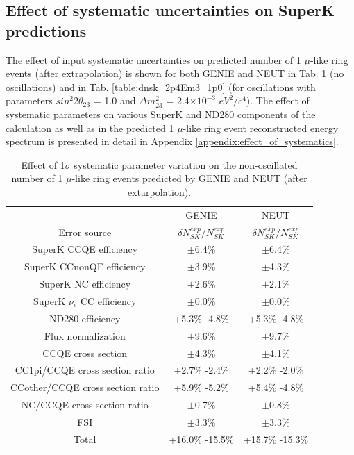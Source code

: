 \clearpage

\subsection {Effect of systematic uncertainties on SuperK predictions}
\label{sec:systematics_tweaked_spectra}

The effect of input systematic uncertainties on predicted number of 1 $\mu$-like ring 
events (after extrapolation) is shown for both GENIE and NEUT 
in Tab. \ref{table:dnsk_noosc} (no oscillations) and
in Tab. \ref{table:dnsk_2p4Em3_1p0} (for oscillations with parameters
$sin^{2}2\theta_{23}$ = 1.0 and $\Delta m^{2}_{23}$ = 2.4$\times10^{-3}$ $eV^{2}/c^{4}$).
The effect of systematic parameters on various SuperK and ND280 components of
the calculation as well as in the predicted 1 $\mu$-like ring event reconstructed energy
spectrum is presented in detail in Appendix \ref{appendix:effect_of_systematics}.

\begin{table}[htb]
\center
\renewcommand{\arraystretch}{1.75} %
\begin{tabular}{|c|c|c|}
\hline
       & GENIE & NEUT \\
Error source  &
  $\delta{N^{exp}_{SK}}/N^{exp}_{SK}$  &
  $\delta{N^{exp}_{SK}}/N^{exp}_{SK}$  \\
\hline
SuperK CCQE efficiency            &   $\pm$6.4\%      &   $\pm$6.4\%      \\
SuperK CCnonQE efficiency         &   $\pm$3.9\%      &   $\pm$4.3\%      \\
SuperK NC efficiency              &   $\pm$2.6\%      &   $\pm$2.1\%      \\
SuperK $\nu_{e}$ CC efficiency    &   $\pm$0.0\%      &   $\pm$0.0\%      \\
ND280 efficiency                  &   +5.3\% -4.8\%   &   +5.3\% -4.8\%   \\
Flux normalization                &   $\pm$9.6\%      &   $\pm$9.7\%      \\
CCQE cross section                &   $\pm$4.3\%      &   $\pm$4.1\%      \\
CC1pi/CCQE cross section ratio    &   +2.7\% -2.4\%   &   +2.2\% -2.0\%   \\
CCother/CCQE cross section ratio  &   +5.9\% -5.2\%   &   +5.4\% -4.8\%   \\
NC/CCQE cross section ratio       &   $\pm$0.7\%      &   $\pm$0.8\%      \\
FSI                               &   $\pm$3.3\%      &   $\pm$3.3\%      \\
\hline
Total                             &   +16.0\% -15.5\% &   +15.7\% -15.3\% \\
\hline
\end{tabular}\\[2pt]
\caption{
  Effect of 1$\sigma$ systematic parameter variation on the non-oscillated number of 1 $\mu$-like ring events
  predicted by GENIE and NEUT (after extarpolation).
}
\label{table:dnsk_noosc}
\end{table}


